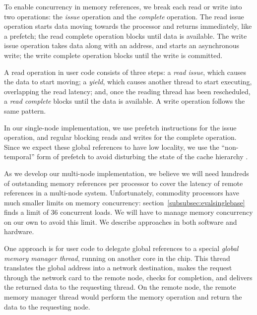 \documentclass[10pt,nocopyrightspace,preprint]{sigplanconf}
\begin{document}
To enable concurrency in memory references, we break each read or
write into two operations: the {\em issue} operation and the {\em
  complete} operation. The read issue operation starts data moving
towards the processor and returns immediately, like a prefetch; the
read complete operation blocks until data is available. The write
issue operation takes data along with an address, and starts an
asynchronous write; the write complete operation blocks until the
write is committed.

A read operation in user code consists of three steps: a {\em read
  issue}, which causes the data to start moving; a {\em yield}, which
causes another thread to start executing, overlapping the read
latency; and, once the reading thread has been rescheduled, a {\em
  read complete} blocks until the data is available. A write operation
follows the same pattern.

In our single-node implementation, we use prefetch instructions for the issue operation, and regular
blocking reads and writes for the complete operation.  Since we expect
these global references to have low locality, we use the
``non-temporal'' form of prefetch to avoid disturbing the state of the
cache hierarchy \cite{intel:swdev}.

As we develop our multi-node implementation, we believe we will need hundreds of outstanding memory references per
processor to cover the latency of remote references in a multi-node
system. Unfortunately, commodity processors have much smaller limits
on memory concurrency: section~\ref{subsubsec:evalsinglebase} finds a
limit of 36 concurrent loads. We will have to manage memory
concurrency on our own to avoid this limit. We describe approaches in
both software and hardware.

One approach is for user code to delegate global references to a
special {\em global memory manager thread}, running on another core in
the chip. This thread translates the global address into a network
destination, makes the request through the network card to the remote
node, checks for completion, and delivers the returned data to the
requesting thread. On the remote node, the remote memory manager
thread would perform the memory operation and return the data to the
requesting node.
\end{document}
